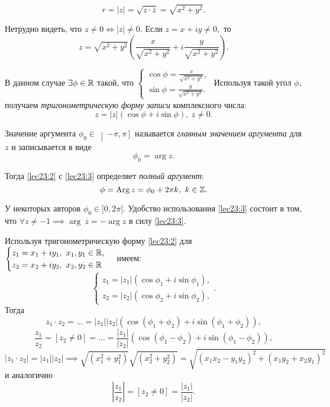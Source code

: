 \documentclass[../../main.tex]{subfiles}
\begin{document}
	\[r = |z| = \sqrt{z\cdot \overline{z}} = \sqrt{x^2+y^2}.\]
	
	Нетрудно видеть, что $z \neq 0 \iff |z| \neq 0.$ Если
	 $z = x+iy \neq 0,$ то \[z = \sqrt{x^2+y^2}\left(\frac{x}{\sqrt{x^2+y^2}}
	 + i\frac{y}{\sqrt{x^2+y^2}}\right). \] 
	
	В данном случае $\exists \phi\in\mathbb{R}$ такой, что 
	$\begin{cases} 
	\cos \phi = \frac{x}{\sqrt{x^2+y^2}},\\
	\sin \phi = \frac{y}{\sqrt{x^2+y^2}}.
	\end{cases}$ Используя такой угол $\phi$, получаем
	\emph{тригонометрическую форму записи} комплексного числа:
	\begin{equation}\label{lec23:2}
	z = |z|(\cos \phi + i \sin\phi),\ z\neq 0.
	\end{equation} 
	
	Значение аргумента ${\phi}_0 \in \left]-\pi, \pi\right]$ называется 
	\emph{главным
	значением аргумента} для $z$ и записывается в виде
	\begin{equation}
	\label{lec23:3}
	{\phi}_0 = \arg z.
	\end{equation}
	
	Тогда \eqref{lec23:2} с \eqref{lec23:3} определяет \emph{полный аргумент}:
	\[ \phi = \operatorname{Arg} z = {\phi}_0+2\pi k,\ k\in\mathbb{Z}. \]
	
	У некоторых авторов ${\phi}_0\in[0, 2\pi[.$ Удобство использования
	\eqref{lec23:3} состоит в том, что $\forall z \neq -1 \implies \arg\
	\overline{z} = - \arg z$ в силу  \eqref{lec23:3}.
	
	Используя тригонометрическую форму  \eqref{lec23:2} для  
	$\begin{cases} 
	z_1 =  x_1+iy_1,\ x_1, y_1\in \mathbb{R},\\
	z_2 =  x_2+iy_2,\ x_2, y_2\in \mathbb{R}
	\end{cases}$ имеем:
	\[\begin{cases} 
	z_1 = |z_1|(\cos {\phi}_1 + i\sin {\phi}_1),\\
	z_2 =  |z_2|(\cos {\phi}_2 + i\sin {\phi}_2),
	\end{cases}.\] Тогда
	\[z_1\cdot z_2 = \ldots = |z_1| |z_2|(\cos({\phi}_1+{\phi}_2)+
	i\sin({\phi}_1+{\phi}_2)),\]
	\[\frac{z_1}{z_2} =[z_2 \neq 0] = \ldots =\frac{ |z_1|}{ |z_2|}
	(\cos({\phi}_1-{\phi}_2)+i\sin({\phi}_1-{\phi}_2)),\]
	\[ |z_1\cdot z_2| = |z_1||z_2| \implies 
	\sqrt{(x_1^2+y_1^2)}\sqrt{(x_2^2+y_2^2)}
	 = \sqrt{(x_1x_2 - y_1y_2)^2 + (x_1y_2+x_2y_1)^2} \]
	и аналогично \[\left|\frac{z_1}{z_2}\right| = [z_2 \neq 0] = 
	\frac{|z_1|}{|z_2|}.\]
	
\end{document}
